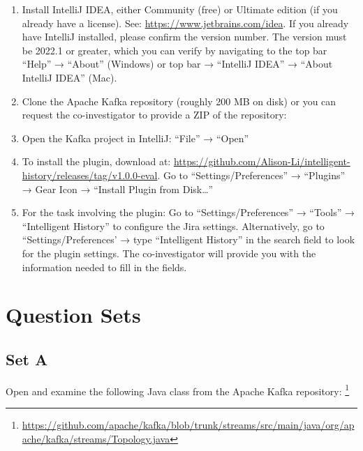 \begin{enumerate}
    \item Install IntelliJ IDEA, either Community (free) or Ultimate edition (if you already have a license). See: \url{https://www.jetbrains.com/idea}. If you already have IntelliJ installed, please confirm the version number. The version must be 2022.1 or greater, which you can verify by navigating to the top bar  ``Help'' → ``About'' (Windows) or top bar → ``IntelliJ IDEA'' → ``About IntelliJ IDEA'' (Mac).
    \item Clone the Apache Kafka repository (roughly 200 MB on disk) or you can request the co-investigator to provide a ZIP of the repository: 
    
    \begin{center}
    \end{center}

    \item Open the Kafka project in IntelliJ: ``File'' → ``Open''
    \item To install the plugin, download  at: \url{https://github.com/Alison-Li/intelligent-history/releases/tag/v1.0.0-eval}. Go to “Settings/Preferences” → ``Plugins'' → Gear Icon → ``Install Plugin from Disk\dots''
    \item For the task involving the plugin: Go to ``Settings/Preferences'' → ``Tools'' → ``Intelligent History'' to configure the Jira settings. Alternatively, go to “Settings/Preferences’ → type ``Intelligent History'' in the search field to look for the plugin settings. The co-investigator will provide you with the information needed to fill in the fields.
\end{enumerate}

\section{Question Sets}

\subsection{Set A}
\label{subsec:Question-Set-A}

Open and examine the following Java class from the Apache Kafka repository:
\footnote{\url{https://github.com/apache/kafka/blob/trunk/streams/src/main/java/org/apache/kafka/streams/Topology.java}}

